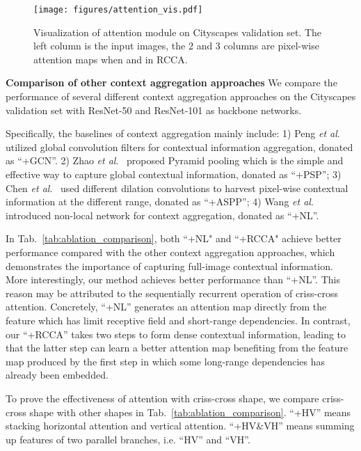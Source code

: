 \documentclass[10pt,journal,compsoc]{IEEEtran}
\def\etal{\emph{et al}.}
\begin{document}
    \begin{figure*}[!t]
        \centering
        \texttt{[image: figures/attention\_vis.pdf]}
        \caption{Visualization of attention module on Cityscapes validation set. The left column is the input images, the 2 and 3 columns are pixel-wise attention maps when  and  in RCCA. }
        \label{fig:attention_vis}
    \end{figure*}

\vspace{1em}
\noindent\textbf{Comparison of other context aggregation approaches}
We compare the performance of several different context aggregation approaches on the Cityscapes validation set with ResNet-50 and ResNet-101 as backbone networks. 


Specifically, the baselines of context aggregation mainly include: 1) Peng \etal~\cite{peng2017large} utilized global convolution filters for contextual information aggregation, donated as ``+GCN''. 2) Zhao \etal ~\cite{zhao2017pyramid} proposed Pyramid pooling which is the simple and effective way to capture global contextual information, donated as ``+PSP''; 3) Chen \etal~\cite{chen2017rethinking} used different dilation convolutions to harvest pixel-wise contextual information at the different range, donated as ``+ASPP''; 4) Wang \etal~\cite{wang2018non} introduced non-local network for context aggregation, donated as ``+NL''.

In Tab.~\ref{tab:ablation_comparison}, both ``+NL" and ``+RCCA" achieve better performance compared with the other context aggregation approaches, which demonstrates the importance of capturing full-image contextual information.
More interestingly, our method achieves better performance than ``+NL''. This reason may be attributed to the sequentially recurrent operation of criss-cross attention. Concretely, ``+NL'' generates an attention map directly from the feature which has limit receptive field and short-range dependencies. In contrast, our ``+RCCA'' takes two steps to form dense contextual information, leading to that the latter step can learn a better attention map benefiting from the feature map produced by the first step in which some long-range dependencies has already been embedded.

To prove the effectiveness of attention with criss-cross shape, we compare criss-cross shape with other shapes in Tab.~\ref{tab:ablation_comparison}. ``+HV'' means stacking horizontal attention and vertical attention. ``+HV\&VH'' means summing up features of two parallel branches, i.e. ``HV'' and ``VH''. 
\end{document}
